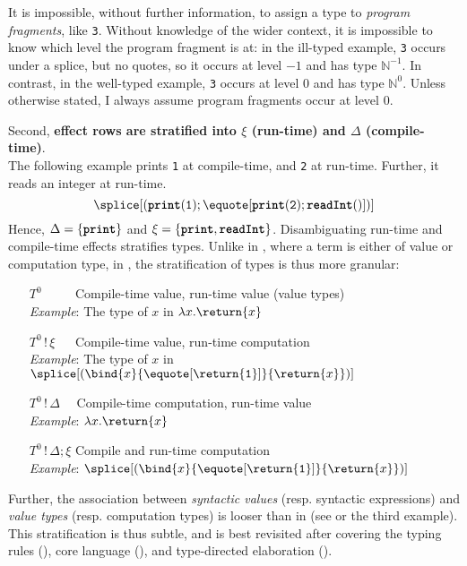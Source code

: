   It is impossible, without further information, to assign a type to \textit{program fragments}, like \texttt{3}. Without knowledge of the wider context, it is impossible to know which level the program fragment is at: in the ill-typed example, \texttt{3} occurs under a splice, but no quotes, so it occurs at level $-1$ and has type $\mathbb{N}^{-1}$. In contrast, in the well-typed example, \texttt{3} occurs at level $0$ and has type $\mathbb{N}^0$. Unless otherwise stated, I always assume program fragments occur at level $0$.

  Second, \textbf{effect rows are stratified into $\xi$ (run-time) and $\Delta$ (compile-time)}.\\
  The following example prints \texttt{1} at compile-time, and \texttt{2} at run-time. Further, it reads an integer at run-time.
\[\splice[{(\textbf{\texttt{print}}(\texttt{1}); \equote[\textbf{\texttt{print}}(\texttt{2}); \textbf{\texttt{readInt}}()])}]\]
Hence, $\Delta = \{ \textbf{\texttt{print}} \}$ and $\xi = \{ \textbf{\texttt{print}}, \textbf{\texttt{readInt}} \}$. Disambiguating run-time and compile-time effects stratifies types. Unlike in \efflang{}, where a term is either of value or computation type, in \sourceLang{}, the stratification of types is thus more granular:
\begin{enumerate}[leftmargin=5.8\parindent]
  \item[$T^0 \quad\quad\,\,$] Compile-time value, run-time value (value types) \\
  \textit{Example}: The type of $x$ in $\lambda x. \return{x}$
  \item[$T^0 \, ! \, \xi \quad\;$] Compile-time value, run-time computation  \\
  \textit{Example}: The type of $x$ in $\splice[(\bind{x}{\equote[\return{\texttt{1}}]}{\return{x}})]$
  \item[$T^0 \, ! \, \Delta \quad$] Compile-time computation, run-time value \\
  \textit{Example}: $\lambda x. \return{x}$ 
  \item[$T^0 \, ! \, \Delta; \xi$] Compile and run-time computation \\
  \textit{Example}: $\splice[(\bind{x}{\equote[\return{\texttt{1}}]}{\return{x}})]$
\end{enumerate}
Further, the association between \textit{syntactic values} (resp. syntactic expressions) and \textit{value types} (resp. computation types) is looser than in \efflang{} (see  or the third example). This stratification is thus subtle, and is best revisited after covering the typing rules (), core language (), and type-directed elaboration ().

